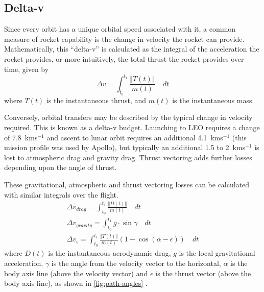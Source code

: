 \subsection{Delta-v} \label{sub:Delta-v}

Since every orbit has a unique orbital speed associated with it, a common measure of rocket capability is the change in velocity the rocket can provide. Mathematically, this \enquote{delta-v} is calculated as the integral of the acceleration the rocket provides, or more intuitively, the total thrust the rocket provides over time, given by
\begin{equation}
\Delta v=\int_{t_{0}}^{t_{1}}\frac{\left\Vert T\left(t\right)\right\Vert }{m\left(t\right)}\quad dt\label{eq:Delta-V}
\end{equation}
where $T\left(t\right)$ is the instantaneous thrust, and $m\left(t\right)$ is the instantaneous mass.

Conversely, orbital transfers may be described by the typical change in velocity required. This is known as a delta-v budget. Launching to LEO requires a change of 7.8~kms$^{-1}$ and ascent to lunar orbit requires an additional 4.1~kms$^{-1}$ (this mission profile was used by Apollo), but typically an additional 1.5 to 2~kms$^{-1}$ is lost to atmospheric drag and gravity drag. Thrust vectoring adds further losses depending upon the angle of thrust. 

These gravitational, atmospheric and thrust vectoring losses can be calculated with similar integrals over the flight. 
\begin{gather}
\Delta v_{drag}=\int_{t_0}^{t_1}\frac{\left\Vert D\left(t\right)\right\Vert }{m\left(t\right)}\quad dt\label{eq:drag-penalty} \\
\Delta v_{gravity}=\int_{t_0}^{t_1}g\cdot\sin\gamma\quad dt\label{eq:gravity-penalty} \\
\Delta v_\epsilon=\int_{t_0}^{t_1}\frac{\left\Vert T\left(t\right)\right\Vert }{m\left(t\right)}(1-\cos(\alpha-\epsilon))\quad dt\label{eq:thrust-vectoring-penalty}
\end{gather}
where $D(t)$ is the instantaneous aerodynamic drag, $g$ is the local gravitational acceleration, $\gamma$ is the angle from the velocity vector to the horizontal, $\alpha$ is the body axis line (above the velocity vector) and $\epsilon$ is the thrust vector (above the body axis line), as shown in \autoref{fig:path-angles} \parencite{Tetlow2003}. 

\begin{figure}
\begin{center}
\label{fig:path-angles}
\end{center}
\end{figure}


